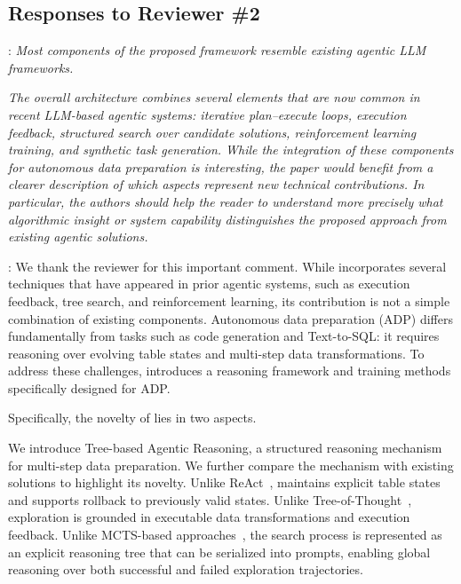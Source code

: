 \subsection*{Responses to Reviewer \#2}
\label{cover_letter:r2}

\begin{shaded}
{

: 
\emph{Most components of the proposed framework resemble existing agentic LLM frameworks.
}

\emph{The overall architecture combines several elements that are now common in recent LLM-based agentic systems: iterative plan–execute loops, execution feedback, structured search over candidate solutions, reinforcement learning training, and synthetic task generation. While the integration of these components for autonomous data preparation is interesting, the paper would benefit from a clearer description of which aspects represent new technical contributions. In particular, the authors should help the reader to understand more precisely what algorithmic insight or system capability distinguishes the proposed approach from existing agentic solutions.}

}
\end{shaded}

:
We thank the reviewer for this important comment.
While \sys incorporates several techniques that have appeared in prior agentic systems, such as execution feedback, tree search, and reinforcement learning, its contribution is not a simple combination of existing components.
Autonomous data preparation (ADP) differs fundamentally from tasks such as code generation and Text-to-SQL: it requires reasoning over evolving table states and multi-step data transformations. To address these challenges, \sys introduces a reasoning framework and training methods specifically designed for ADP.

Specifically, the novelty of \sys lies in two aspects.

We introduce Tree-based Agentic Reasoning, a structured reasoning mechanism for multi-step data preparation. 
We further compare the mechanism with existing solutions to highlight its novelty.
Unlike ReAct~\cite{yao2023react}, \sys maintains explicit table states and supports rollback to previously valid states. Unlike Tree-of-Thought~\cite{yao2023tree}, exploration is grounded in executable data transformations and execution feedback. Unlike MCTS-based approaches~\cite{li2025alphasql}, the search process is represented as an explicit reasoning tree that can be serialized into prompts, enabling global reasoning over both successful and failed exploration trajectories.

